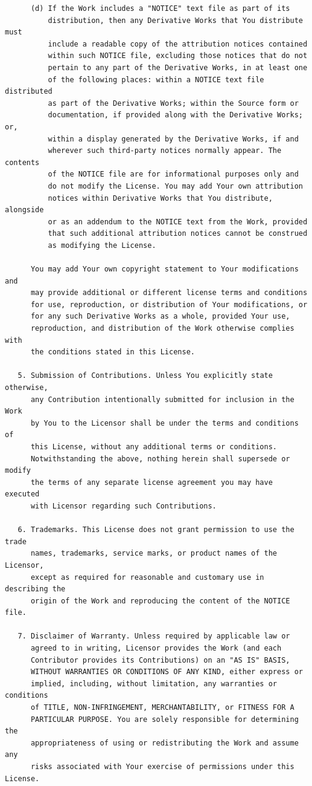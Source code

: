 \begin{dirlistbrief}
\begin{verbatim}
      (d) If the Work includes a "NOTICE" text file as part of its
          distribution, then any Derivative Works that You distribute must
          include a readable copy of the attribution notices contained
          within such NOTICE file, excluding those notices that do not
          pertain to any part of the Derivative Works, in at least one
          of the following places: within a NOTICE text file distributed
          as part of the Derivative Works; within the Source form or
          documentation, if provided along with the Derivative Works; or,
          within a display generated by the Derivative Works, if and
          wherever such third-party notices normally appear. The contents
          of the NOTICE file are for informational purposes only and
          do not modify the License. You may add Your own attribution
          notices within Derivative Works that You distribute, alongside
          or as an addendum to the NOTICE text from the Work, provided
          that such additional attribution notices cannot be construed
          as modifying the License.

      You may add Your own copyright statement to Your modifications and
      may provide additional or different license terms and conditions
      for use, reproduction, or distribution of Your modifications, or
      for any such Derivative Works as a whole, provided Your use,
      reproduction, and distribution of the Work otherwise complies with
      the conditions stated in this License.

   5. Submission of Contributions. Unless You explicitly state otherwise,
      any Contribution intentionally submitted for inclusion in the Work
      by You to the Licensor shall be under the terms and conditions of
      this License, without any additional terms or conditions.
      Notwithstanding the above, nothing herein shall supersede or modify
      the terms of any separate license agreement you may have executed
      with Licensor regarding such Contributions.

   6. Trademarks. This License does not grant permission to use the trade
      names, trademarks, service marks, or product names of the Licensor,
      except as required for reasonable and customary use in describing the
      origin of the Work and reproducing the content of the NOTICE file.

   7. Disclaimer of Warranty. Unless required by applicable law or
      agreed to in writing, Licensor provides the Work (and each
      Contributor provides its Contributions) on an "AS IS" BASIS,
      WITHOUT WARRANTIES OR CONDITIONS OF ANY KIND, either express or
      implied, including, without limitation, any warranties or conditions
      of TITLE, NON-INFRINGEMENT, MERCHANTABILITY, or FITNESS FOR A
      PARTICULAR PURPOSE. You are solely responsible for determining the
      appropriateness of using or redistributing the Work and assume any
      risks associated with Your exercise of permissions under this License.


\end{verbatim}
\end{dirlistbrief}
